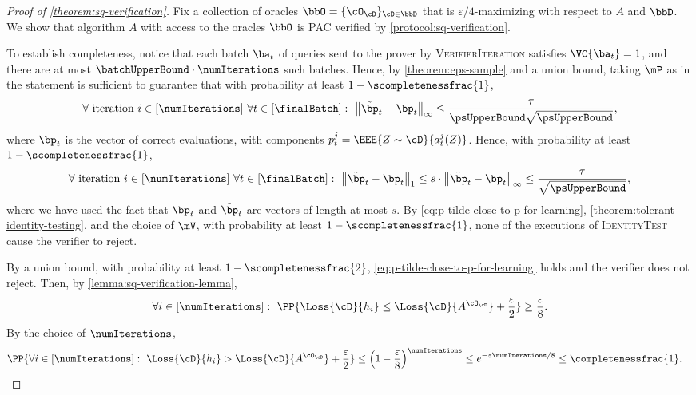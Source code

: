 \begin{proof}[Proof of \cref{theorem:sq-verification}]
	Fix a collection of oracles $\bbO = \{\cO_\cD\}_{\cD \in \bbD}$ that is $\varepsilon/4$-maximizing with respect to $A$ and $\bbD$.
	We show that algorithm $A$ with access to the oracles $\bbO$ is PAC verified by \cref{protocol:sq-verification}.
	
	To establish completeness, notice that each batch $\ba_t$ of queries sent to the prover by \textsc{VerifierIteration} satisfies $\VC{\ba_t} = 1$, and there are at most $\batchUpperBound \cdot \numIterations$ such batches. Hence, by \cref{theorem:eps-sample} and a union bound, taking $\mP$ as in the statement is sufficient to guarantee that with probability at least $1-\scompletenessfrac{1}$, 
	\[
		\forall \text{ iteration } i \in [\numIterations] ~ \forall t \in [\finalBatch]: ~  \left\|\tilde{\bp}_t  - \bp_t\right\|_\infty \leq \frac{\tau}{\psUpperBound\sqrt{\psUpperBound}},
	\]
	where $\bp_t$ is the vector of correct evaluations, with components $p_t^j = \EEE{Z \sim \cD}{a_t^j(Z)}$. Hence, with probability at least $1-\scompletenessfrac{1}$,
	\begin{equation}\label{eq:p-tilde-close-to-p-for-learning}
		\forall \text{ iteration } i \in [\numIterations] ~ \forall t \in [\finalBatch]: ~  \left\|\tilde{\bp}_t  - \bp_t\right\|_1
		\leq 
		s \cdot \left\|\tilde{\bp}_t  - \bp_t\right\|_\infty
		\leq 
		\frac{\tau}{\sqrt{\psUpperBound}},
	\end{equation}
	where we have used the fact that $\bp_t$ and $\tilde{\bp}_t$ are vectors of length at most $s$. 
	By \cref{eq:p-tilde-close-to-p-for-learning}, \cref{theorem:tolerant-identity-testing}, and the choice of $\mV$, with probability at least $1-\scompletenessfrac{1}$, none of the executions of \textsc{IdentityTest} cause the verifier to reject.
	
	By a union bound, with probability at least $1-\scompletenessfrac{2}$, \cref{eq:p-tilde-close-to-p-for-learning} holds and the verifier does not reject. Then, by \cref{lemma:sq-verification-lemma}, 
	\begin{equation}\label{eq:h-is-good-with-pr-eps}
		\forall i \in [\numIterations]: ~ \PP{\Loss{\cD}{h_i} \leq \Loss{\cD}{A^{\cO_\cD}} + \frac{\varepsilon}{2}} \geq \frac{\varepsilon}{8}.
	\end{equation}
	By the choice of $\numIterations$,
	\begin{align}\label{eq:exists-good-h}
		\PP{\forall i \in [\numIterations]: ~ \Loss{\cD}{h_i} > \Loss{\cD}{A^{\cO_\cD}} + \frac{\varepsilon}{2}} &\leq \left(1-\frac{\varepsilon}{8}\right)^\numIterations \leq e^{-\varepsilon\numIterations/8} \leq \completenessfrac{1}.
	\end{align}
	

\end{proof}
